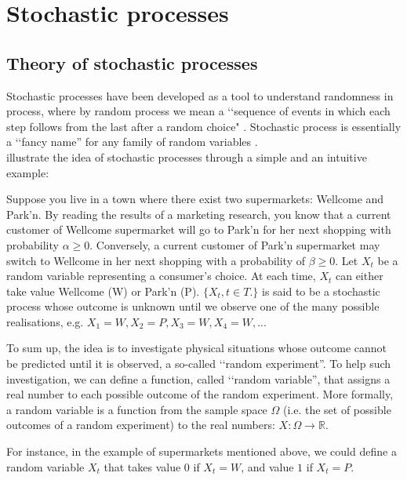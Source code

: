 \documentclass[\main/main.tex]{subfiles}
\begin{document}
\section{Stochastic processes}

\subsection{Theory of stochastic processes}

Stochastic processes have been developed as a tool to understand randomness in process, where by random process we mean a \lq\lq sequence of events in which each step follows from the last after a random choice" \citep{Holmes2015}. Stochastic process is essentially a \lq\lq fancy name'' for any family of random variables \citep{Chung2010}.\\
\cite{Ching2006} illustrate the idea of stochastic processes through a simple and an intuitive example:\\

\begin{small}
Suppose you live in a town where there exist two supermarkets: Wellcome and Park'n.
By reading the results of a marketing research, you know that a current customer of Wellcome supermarket will go to Park’n for her next shopping
with probability $\alpha \geq 0 $. Conversely, a current customer of Park'n supermarket may switch to Wellcome in her next shopping with a probability of $\beta \geq 0$. Let $X_t$ be a random variable representing a consumer's choice. At each time, $X_t$ can either take value Wellcome (W) or Park'n (P). $\{X_t, t \in T.\}$ is said to be a stochastic process whose outcome is unknown until we observe one of the many possible realisations, e.g. $X_1 = W, X_2 = P, X_3 = W, X_4 = W, ... $\\
\end{small}


\noindent To sum up, the idea is to investigate physical situations whose outcome cannot be predicted until it is observed, a so-called \lq\lq random experiment''. To help such investigation, we can define a function, called \lq\lq random variable'', that assigns a real number to each possible outcome of the random experiment. More formally, a random variable is a function from the sample space $\Omega $ (i.e. the set of possible outcomes of a random experiment) to the real numbers: $X : \Omega \rightarrow \mathds{R}$.

For instance, in the example of supermarkets mentioned above, we could define a random variable $X_t$ that takes value $0$ if $X_t = W$, and value $1$ if $X_t = P$.\\
\end{document}
